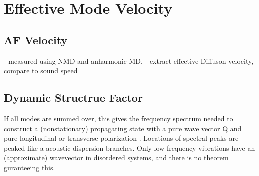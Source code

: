 \documentclass[aps,prb,preprint,superscriptaddress,amsmath,amssymb,floatfix]{revtex4}
\begin{document}
\section{\label{S:GroupVeloctiy}Effective Mode Velocity}

\subsection{\label{S-Motivation-Amorphous}AF Velocity}
- measured using NMD and anharmonic MD.
- extract effective Diffuson velocity, compare to sound speed



\vspace*{100mm}

\subsection{\label{S:Lifetimes:}Dynamic Structrue Factor}
If all modes are summed over, this gives the frequency spectrum
needed to construct a (nonstationary) propagating state with a
pure wave vector Q and pure longitudinal or transverse polarization
 \cite{feldman_thermal_1993}. Locations of spectral peaks are peaked 
like a acoustic dispersion branches. Only low-frequency vibrations 
have an (approximate) wavevector in disordered systems, and there is 
no theorem guranteeing this. \cite{feldman_numerical_1999}
\end{document}
